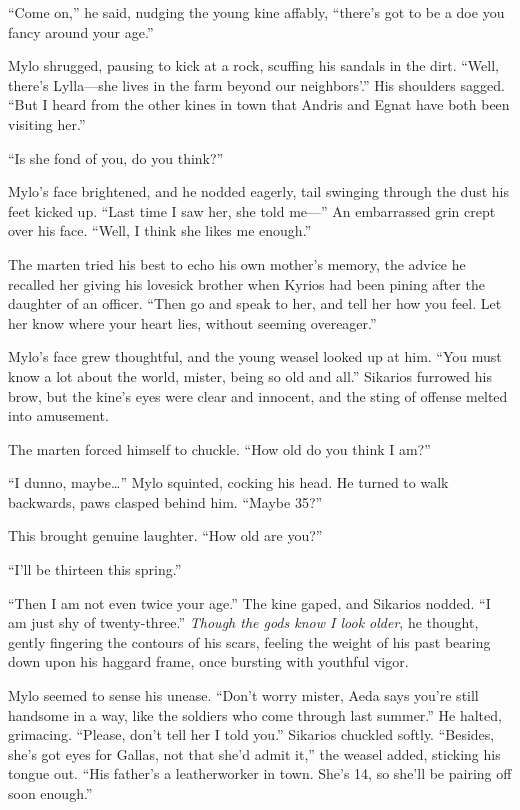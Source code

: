 ``Come on,'' he said, nudging the young kine affably, ``there's got to be a doe you fancy around your age.''

Mylo shrugged, pausing to kick at a rock, scuffing his sandals in the dirt. ``Well, there's Lylla---she lives in the farm beyond our neighbors'.'' His shoulders sagged. ``But I heard from the other kines in town that Andris and Egnat have both been visiting her.''

``Is she fond of you, do you think?''

Mylo's face brightened, and he nodded eagerly, tail swinging through the dust his feet kicked up. ``Last time I saw her, she told me---'' An embarrassed grin crept over his face. ``Well, I think she likes me enough.''

The marten tried his best to echo his own mother's memory, the advice he recalled her giving his lovesick brother when Kyrios had been pining after the daughter of an officer. ``Then go and speak to her, and tell her how you feel. Let her know where your heart lies, without seeming overeager.''

Mylo's face grew thoughtful, and the young weasel looked up at him. ``You must know a lot about the world, mister, being so old and all.'' Sikarios furrowed his brow, but the kine's eyes were clear and innocent, and the sting of offense melted into amusement.

The marten forced himself to chuckle. ``How old do you think I am?''

``I dunno, maybe\ldots'' Mylo squinted, cocking his head. He turned to walk backwards, paws clasped behind him. ``Maybe 35?''

This brought genuine laughter. ``How old are you?''

``I'll be thirteen this spring.''

``Then I am not even twice your age.'' The kine gaped, and Sikarios nodded. ``I am just shy of twenty-three.'' \emph{Though the gods know I look older}, he thought, gently fingering the contours of his scars, feeling the weight of his past bearing down upon his haggard frame, once bursting with youthful vigor.

Mylo seemed to sense his unease. ``Don't worry mister, Aeda says you're still handsome in a way, like the soldiers who come through last summer.'' He halted, grimacing. ``Please, don't tell her I told you.'' Sikarios chuckled softly. ``Besides, she's got eyes for Gallas, not that she'd admit it,'' the weasel added, sticking his tongue out. ``His father's a leatherworker in town. She's 14, so she'll be pairing off soon enough.''

